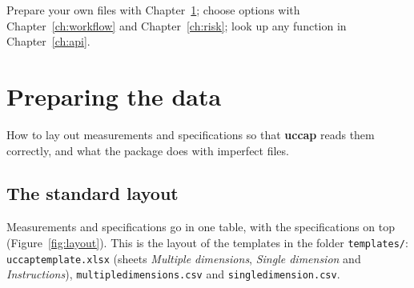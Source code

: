 \documentclass[a4paper,11pt,oneside,openany,parskip=half-,headings=standardclasses,toc=flat,numbers=noenddot]{scrbook}
\newcommand{\code}[1]{\texttt{\begingroup\def\_{\textunderscore\allowbreak}#1\endgroup}}
\newcommand{\pkg}{\textsf{\bfseries uccap}}
\newenvironment{chapterintro}{\begingroup\sffamily\small\color{muted}\noindent\ignorespaces}{\par\endgroup\medskip}
\newcommand{\chapref}[1]{Chapter~\ref{#1}}
\newcommand{\figref}[1]{Figure~\ref{#1}}
\begin{document}
\begin{keypoint}
Prepare your own files with \chapref{ch:data}; choose options with \chapref{ch:workflow} and
\chapref{ch:risk}; look up any function in \chapref{ch:api}.
\end{keypoint}

\chapter{Preparing the data}\label{ch:data}

\begin{chapterintro}
How to lay out measurements and specifications so that \pkg{} reads them correctly, and what the
package does with imperfect files.
\end{chapterintro}

\section{The standard layout}\label{sec:standard}

Measurements and specifications go in one table, with the specifications on top
(\figref{fig:layout}). This is the layout of the templates in the folder \code{templates/}:
\code{uccap\_template.xlsx} (sheets \emph{Multiple dimensions}, \emph{Single dimension} and
\emph{Instructions}), \code{multiple\_dimensions.csv} and \code{single\_dimension.csv}.
\end{document}
